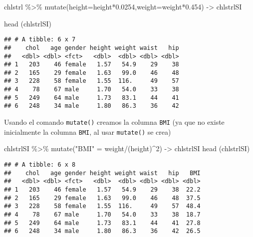 \documentclass[
]{article}
\newenvironment{Shaded}{\begin{snugshade}}{\end{snugshade}}
\newcommand{\AttributeTok}[1]{\textcolor[rgb]{0.77,0.63,0.00}{#1}}
\newcommand{\DecValTok}[1]{\textcolor[rgb]{0.00,0.00,0.81}{#1}}
\newcommand{\FloatTok}[1]{\textcolor[rgb]{0.00,0.00,0.81}{#1}}
\newcommand{\FunctionTok}[1]{\textcolor[rgb]{0.00,0.00,0.00}{#1}}
\newcommand{\NormalTok}[1]{#1}
\newcommand{\OtherTok}[1]{\textcolor[rgb]{0.56,0.35,0.01}{#1}}
\newcommand{\SpecialCharTok}[1]{\textcolor[rgb]{0.00,0.00,0.00}{#1}}
\newcommand{\StringTok}[1]{\textcolor[rgb]{0.31,0.60,0.02}{#1}}
\begin{document}
\begin{Shaded}
\begin{Highlighting}[]
\NormalTok{chlstrl }\SpecialCharTok{\%\textgreater{}\%} \FunctionTok{mutate}\NormalTok{(}\AttributeTok{height=}\NormalTok{height}\SpecialCharTok{*}\FloatTok{0.0254}\NormalTok{,}\AttributeTok{weight=}\NormalTok{weight}\SpecialCharTok{*}\FloatTok{0.454}\NormalTok{) }\OtherTok{{-}\textgreater{}}\NormalTok{ chlstrlSI}
\end{Highlighting}
\end{Shaded}

\begin{Shaded}
\begin{Highlighting}[]
\FunctionTok{head}\NormalTok{ (chlstrlSI)}
\end{Highlighting}
\end{Shaded}

\begin{verbatim}
## # A tibble: 6 x 7
##    chol   age gender height weight waist   hip
##   <dbl> <dbl> <fct>   <dbl>  <dbl> <dbl> <dbl>
## 1   203    46 female   1.57   54.9    29    38
## 2   165    29 female   1.63   99.0    46    48
## 3   228    58 female   1.55  116.     49    57
## 4    78    67 male     1.70   54.0    33    38
## 5   249    64 male     1.73   83.1    44    41
## 6   248    34 male     1.80   86.3    36    42
\end{verbatim}

Usando el comando \texttt{mutate()} creamos la columna \texttt{BMI} (ya
que no existe inicialmente la columna \texttt{BMI}, al usar
\texttt{mutate()} se crea)

\begin{Shaded}
\begin{Highlighting}[]
\NormalTok{chlstrlSI }\SpecialCharTok{\%\textgreater{}\%}
  \FunctionTok{mutate}\NormalTok{(}\StringTok{"BMI"} \OtherTok{=}\NormalTok{ weight}\SpecialCharTok{/}\NormalTok{(height)}\SpecialCharTok{\^{}}\DecValTok{2}\NormalTok{) }\OtherTok{{-}\textgreater{}}\NormalTok{ chlstrlSI}
\FunctionTok{head}\NormalTok{ (chlstrlSI)}
\end{Highlighting}
\end{Shaded}

\begin{verbatim}
## # A tibble: 6 x 8
##    chol   age gender height weight waist   hip   BMI
##   <dbl> <dbl> <fct>   <dbl>  <dbl> <dbl> <dbl> <dbl>
## 1   203    46 female   1.57   54.9    29    38  22.2
## 2   165    29 female   1.63   99.0    46    48  37.5
## 3   228    58 female   1.55  116.     49    57  48.4
## 4    78    67 male     1.70   54.0    33    38  18.7
## 5   249    64 male     1.73   83.1    44    41  27.8
## 6   248    34 male     1.80   86.3    36    42  26.5
\end{verbatim}
\end{document}

